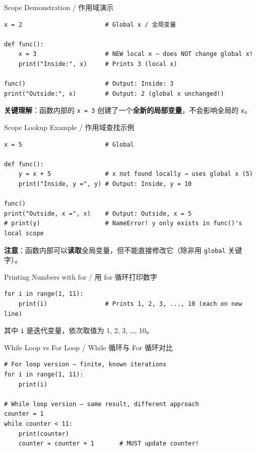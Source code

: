 \documentclass[11pt,a4paper]{report}
\let\oldtexttt\texttt
\renewcommand{\texttt}[1]{\textcolor{mainblue}{\oldtexttt{#1}}}
\begin{document}
\begin{examplebox}{Scope Demonstration / 作用域演示}
\begin{lstlisting}
x = 2                       # Global x / 全局变量

def func():
    x = 3                   # NEW local x — does NOT change global x!
    print("Inside:", x)     # Prints 3 (local x)

func()                      # Output: Inside: 3
print("Outside:", x)        # Output: 2 (global x unchanged!)
\end{lstlisting}
    \textbf{关键理解}：函数内部的 \texttt{x = 3} 创建了一个\textbf{全新的局部变量}，不会影响全局的 \texttt{x}。
\end{examplebox}

\begin{examplebox}{Scope Lookup Example / 作用域查找示例}
\begin{lstlisting}
x = 5                       # Global

def func():
    y = x + 5               # x not found locally → uses global x (5)
    print("Inside, y =", y) # Output: Inside, y = 10

func()
print("Outside, x =", x)    # Output: Outside, x = 5
# print(y)                  # NameError! y only exists in func()'s local scope
\end{lstlisting}
    \textbf{注意}：函数内部可以\textbf{读取}全局变量，但不能直接修改它（除非用 \texttt{global} 关键字）。
\end{examplebox}

\begin{examplebox}{Printing Numbers with for / 用 for 循环打印数字}
\begin{lstlisting}
for i in range(1, 11):
    print(i)                # Prints 1, 2, 3, ..., 10 (each on new line)
\end{lstlisting}
    其中 \texttt{i} 是迭代变量，依次取值为 1, 2, 3, …, 10。
\end{examplebox}

\begin{examplebox}{While Loop vs For Loop / While 循环与 For 循环对比}
\begin{lstlisting}
# For loop version — finite, known iterations
for i in range(1, 11):
    print(i)

# While loop version — same result, different approach
counter = 1
while counter < 11:
    print(counter)
    counter = counter + 1       # MUST update counter!
\end{lstlisting}
\end{examplebox}
\end{document}
